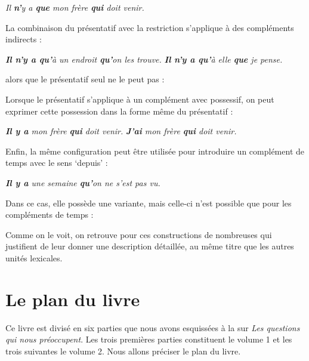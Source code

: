 {   \ea
    \textit{{Il} \textbf{{n’}}{y a} \textbf{{que}} {mon frère \textbf{qui} doit venir.}}
    \z

  \noindent  La combinaison du présentatif avec la restriction s’applique à des compléments indirects :

   \ea
   \ea   \textit{\textbf{{Il n’y} {a qu’}}{à un endroit} \textbf{{qu’}}{on les trouve.}}
   \ex   \textit{\textbf{{Il n’y} {a qu’}}{à elle} \textbf{{que}} {je pense.}}
   \z
   \z

 \noindent  alors que le présentatif seul ne le peut pas :

   \ea
   \z
   \z

  \noindent  Lorsque le présentatif s’applique à un complément avec possessif, on peut exprimer cette possession dans la forme même du présentatif :

   \ea
    \ea \textit{\textbf{{Il y a}} {mon frère} \textbf{{qui}} {doit venir.}}
    \ex \textit{\textbf{{J’ai}} {mon frère} \textbf{{qui}} {doit venir.}}
    \z
    \z

   \noindent Enfin, la même configuration peut être utilisée pour introduire un complément de temps avec le sens ‘depuis’ :

   \ea
    \textit{\textbf{{Il y a}} {une semaine} \textbf{{qu’}}{on ne s’est} {pas vu.}}
    \z

 \noindent   Dans ce cas, elle possède une variante, mais celle-ci n’est possible que pour les compléments de temps :

   \ea
   \z
   \z

   Comme on le voit, on retrouve pour ces constructions de nombreuses  qui justifient de leur donner une description détaillée, au même titre que les autres unités lexicales.}
   
\section{Le plan du livre}\label{sec:0.0.8}

Ce livre est divisé en six parties que nous avons esquissées à la  sur \textit{Les questions qui nous préoccupent}. Les trois premières parties constituent le volume 1 et les trois suivantes le volume 2. Nous allons préciser le plan du livre.


